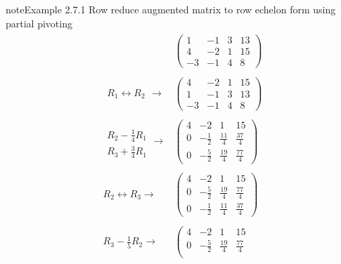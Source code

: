 \documentclass[letterpaper,10pt,english]{jupyterBook}
\begin{document}
\begin{sphinxadmonition}{note}{Example 2.7.1}
\sphinxAtStartPar
Row reduce augmented matrix to row echelon form using partial pivoting
\begin{equation*}
\begin{split} \begin{align*}
    & \left(\begin{array}{ccc|c}
        1 & -1 & 3 & 13 \\
        4 & -2 & 1 & 15\\
        -3 & -1 & 4 & 8
    \end{array} \right)
	\\ \\    
	\begin{array}{l} R_1 \leftrightarrow R_2 \end{array} 
    \longrightarrow &
    \left( \begin{array}{ccc|c}
        4 & -2 & 1 & 15\\
        1 & -1 & 3 & 13 \\
        -3 & -1 & 4 & 8
    \end{array} \right)
    \\ \\
    \begin{array}{l} \\ R_2 - \frac{1}{4}R_1 \\[1pt] R_3 + \frac{3}{4}R_1 \end{array}  \longrightarrow &
    \left( \begin{array}{ccc|c}
        4 & -2 & 1 & 15 \\
        0 & -\frac{1}{2} & \frac{11}{4} & \frac{37}{4} \\
        0 & -\frac{5}{2} & \frac{19}{4} & \frac{77}{4}
    \end{array} \right)
   \\ \\
     R_2 \leftrightarrow R_3 \longrightarrow &
    \left( \begin{array}{ccc|c}
        4 & -2 & 1 & 15\\
        0 & -\frac{5}{2} & \frac{19}{4} & \frac{77}{4} \\
        0 & -\frac{1}{2} & \frac{11}{4} & \frac{37}{4}
    \end{array} \right)
     \\ \\
    R_3 - \frac{1}{5}R_2  \longrightarrow &
    \left( \begin{array}{ccc|c}
        4 & -2 & 1 & 15\\
        0 & -\frac{5}{2} & \frac{19}{4} & \frac{77}{4} \\

\end{array}
\end{align*}
\end{split}
\end{equation*}
\end{sphinxadmonition}
\end{document}
